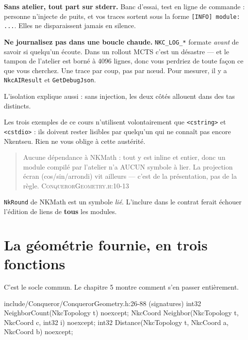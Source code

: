 \begin{nkpiege}
\textbf{Sans atelier, tout part sur stderr.} Banc d'essai, test en ligne de
commande : personne n'injecte de puits, et vos traces sortent sous la forme
\texttt{[INFO] module: ...}. Elles ne disparaissent jamais en silence.

\textbf{Ne journalisez pas dans une boucle chaude.} \texttt{NKC\_LOG\_*} formate
\emph{avant} de savoir si quelqu'un écoute. Dans un rollout MCTS c'est un
désastre — et le tampon de l'atelier est borné à 4096 lignes, donc vous perdriez
de toute façon ce que vous cherchez. Une trace par coup, pas par nœud. Pour
mesurer, il y a \texttt{NkcAIResult} et \texttt{GetDebugJson}.
\end{nkpiege}

L'isolation explique aussi  : sans injection, les
deux côtés allouent dans des tas distincts.

Les trois exemples de ce cours n'utilisent volontairement que
\texttt{<cstring>} et \texttt{<cstdio>} : ils doivent rester lisibles par
quelqu'un qui ne connaît pas encore Nkentseu. Rien ne vous oblige à cette
austérité.

\begin{nkpiege}
\begin{quote}\small
Aucune dépendance à NKMath : tout y est inline et entier, donc un module compilé
par l'atelier n'a AUCUN symbole à lier. La projection écran (cos/sin/arrondi) vit
ailleurs — c'est de la présentation, pas de la règle.
\hfill\textsc{ConquerorGeometry.h:10-13}
\end{quote}

\texttt{NkRound} de NKMath est un symbole \emph{lié}. L'inclure dans le contrat
ferait échouer l'édition de liens de \textbf{tous} les modules.
\end{nkpiege}

\section{La géométrie fournie, en trois fonctions}

C'est le socle commun. Le chapitre 5 montre comment s'en passer entièrement.

\begin{nkcode}{include/Conqueror/ConquerorGeometry.h:26-88 (signatures)}
int32    NeighborCount(NkcTopology t) noexcept;
NkcCoord Neighbor(NkcTopology t, NkcCoord c, int32 i) noexcept;
int32    Distance(NkcTopology t, NkcCoord a, NkcCoord b) noexcept;
\end{nkcode}

